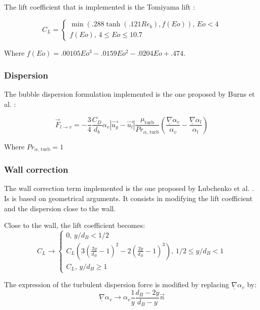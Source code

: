 The lift coefficient that is implemented is the Tomiyama lift \cite{Tomiyama2002}:

\begin{equation}
	C_L = \begin{cases} \min(.288\tanh(.121Re_b),f(Eo)) \text{,~} Eo<4 \\ f(Eo) \text{,~} 4 \leq Eo \leq 10.7 \end{cases}
\end{equation}

Where $f(Eo) = .00105Eo^3 - .0159Eo^2 - .0204 Eo + .474$.

\subsubsection{Dispersion}

The bubble dispersion formulation implemented is the one proposed by Burns et al. \cite{Burns2004}:

\begin{equation}
\vec{F}_{l\rightarrow v} = -\frac{3}{4} \frac{C_D}{d_b}\alpha_v|\vec{u_g}-\vec{u_l}|\frac{\mu_{\text{turb}}}{Pr_{\alpha\text{, turb}}}
\left(\frac{\underline{\nabla}\alpha_v}{\alpha_v}-\frac{\underline{\nabla}\alpha_l}{\alpha_l}\right)
\end{equation}

Where $Pr_{\alpha\text{, turb}}=1$

\subsubsection{Wall correction}

The wall correction term implemented is the one proposed by Lubchenko et al. \cite{Lubchenko2018}. Is is based on geometrical arguments. It consists in modifying the lift coefficient and the dispersion close to the wall.

Close to the wall, the lift coefficient becomes:
\begin{equation}
	C_L \rightarrow \begin{cases} 0 \text{,~} y/d_B<1/2  \\
	C_L\left(3\left(\frac{2y}{d_B}-1\right)^2-2\left(\frac{2y}{d_B}-1\right)^3\right) \text{,~} 1/2 \leq y/d_B < 1 \\
	C_L \text{,~} y/d_B\geq 1 \end{cases}
\end{equation}

The expression of the turbulent dispersion force is modified by replacing $\underline{\nabla}\alpha_v$ by:
\begin{equation}
	 \underline{\nabla}\alpha_v \rightarrow \alpha_v\frac{1}{y}\frac{d_B-2y}{d_B-y}\overrightarrow{n}
\end{equation}

